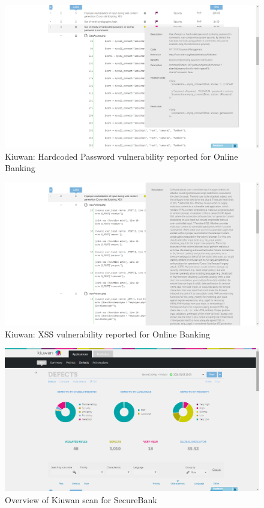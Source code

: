 \begin{figure}[ht]
	\centering
	\includegraphics[width=.8\linewidth]{figures/kiuwan_hardcoded_password.png}
	\caption{Kiuwan: Hardcoded Password vulnerability reported for Online Banking}
	\label{fig:kiuwan_hardcoded_password}
\end{figure}

\begin{figure}[ht]
	\centering
	\includegraphics[width=.8\linewidth]{figures/kiuwan_xss.png}
	\caption{Kiuwan: XSS vulnerability reported for Online Banking}
	\label{fig:kiuwan_xss}
\end{figure}

\begin{figure}[ht]
	\centering
	\includegraphics[width=.8\linewidth]{figures/kiuwan_overview_secure_bank.png}
	\caption{Overview of Kiuwan scan for SecureBank}
	\label{fig:kiuwan_overview_secure_bank}
\end{figure}